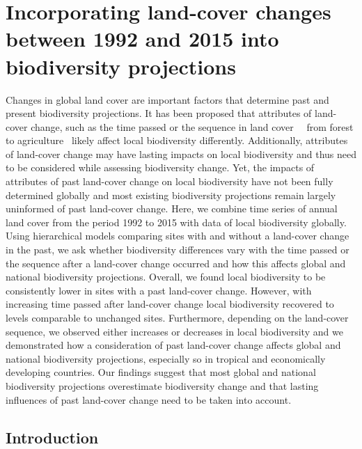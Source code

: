 \chapter{Incorporating land-cover changes between 1992 and 2015 into biodiversity projections }
\label{C04}

Changes in global land cover are important factors that determine past and present biodiversity projections. It has been proposed that attributes of land-cover change, such as the time passed or the sequence in land cover \textendash\ \ie\ from forest to agriculture \textendash\ likely affect local biodiversity differently. Additionally, attributes of land-cover change may have lasting impacts on local biodiversity and thus need to be considered while assessing biodiversity change. Yet, the impacts of attributes of past land-cover change on local biodiversity have not been fully determined globally and most existing biodiversity projections remain largely uninformed of past land-cover change. Here, we combine time series of annual land cover from the period 1992 to 2015 with data of local biodiversity globally. Using hierarchical models comparing sites with and without a land-cover change in the past, we ask whether biodiversity differences vary with the time passed or the sequence after a land-cover change occurred and how this affects global and national biodiversity projections. Overall, we found local biodiversity to be consistently lower in sites with a past land-cover change. However, with increasing time passed after land-cover change local biodiversity recovered to levels comparable to unchanged sites. Furthermore, depending on the land-cover sequence, we observed either increases or decreases in local biodiversity and we demonstrated how a consideration of past land-cover change affects global and national biodiversity projections, especially so in tropical and economically developing countries. Our findings suggest that most global and national biodiversity projections overestimate biodiversity change and that lasting influences of past land-cover change need to be taken into account.

\section{Introduction}
\label{C04_01}

